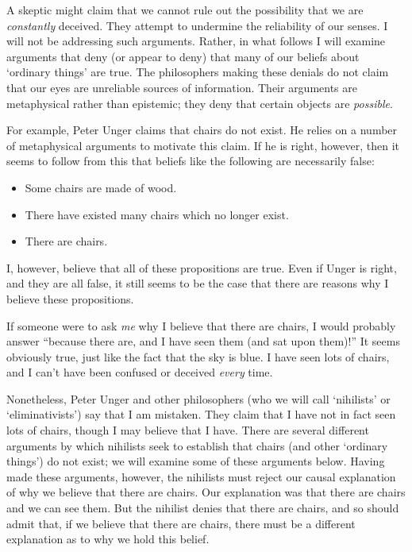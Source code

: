 \documentclass[11pt]{standalone}
\begin{document}
\begin{spacing}{1.5}
A skeptic might claim that we cannot rule out the possibility that we
are {\em constantly} deceived.  They attempt to undermine the
reliability of our senses.  I will not be addressing such arguments.
Rather, in what follows I will examine arguments that deny (or appear
to deny) that many of our beliefs about `ordinary things' are true.
The philosophers making these denials do not claim that our eyes are
unreliable sources of information.  Their arguments are metaphysical
rather than epistemic; they deny that certain objects are {\em
  possible}.  

For example, Peter Unger claims that chairs do not exist.  He relies
on a number of metaphysical arguments to motivate this claim.  If he
is right, however, then it seems to follow from this that beliefs like
the following are necessarily false:

\begin{itemize}
  \item Some chairs are made of wood.
  \item There have existed many chairs which no longer exist.
  \item There are chairs.
\end{itemize}

I, however, believe that all of these propositions are true.  Even if
Unger is right, and they are all false, it still seems to be the case
that there are reasons why I believe these propositions.

If someone were to ask {\em me} why I believe that there are chairs, I
would probably answer ``because there are, and I have seen them (and
sat upon them)!''  It seems obviously true, just like the fact that
the sky is blue.  I have seen lots of chairs, and I can't have been
confused or deceived {\em every} time.

Nonetheless, Peter Unger and other philosophers (who we will call
`nihilists' or `eliminativists') say that I am mistaken.  They claim
that I have not in fact seen lots of chairs, though I may believe that
I have.  There are several different arguments by which nihilists seek
to establish that chairs (and other `ordinary things') do not exist;
we will examine some of these arguments below.  Having made these
arguments, however, the nihilists must reject our causal explanation
of why we believe that there are chairs.  Our explanation was that
there are chairs and we can see them.  But the nihilist denies that
there are chairs, and so should admit that, if we believe that there
are chairs, there must be a different explanation as to why we hold
this belief.


\end{spacing}
\end{document}
